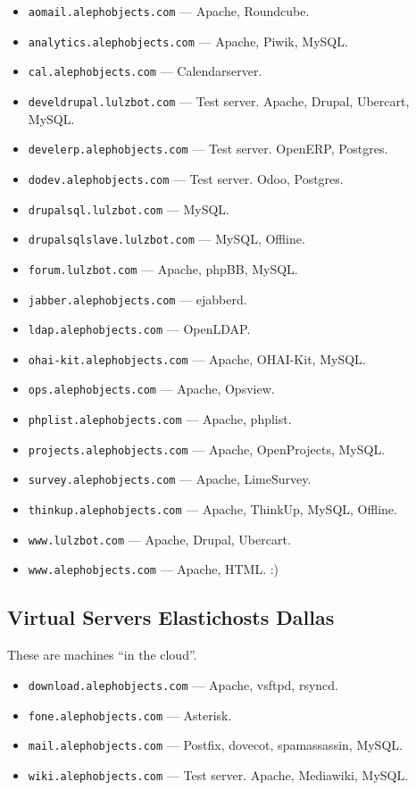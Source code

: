 \begin{itemize}
\item \texttt{aomail.alephobjects.com} --- Apache, Roundcube.
\item \texttt{analytics.alephobjects.com}  --- Apache, Piwik, MySQL.
\item \texttt{cal.alephobjects.com} --- Calendarserver.
\item \texttt{develdrupal.lulzbot.com} --- Test server. Apache, Drupal,
       Ubercart, MySQL.
\item \texttt{develerp.alephobjects.com} --- Test server. OpenERP, Postgres.
\item \texttt{dodev.alephobjects.com} --- Test server. Odoo, Postgres.
\item \texttt{drupalsql.lulzbot.com} --- MySQL.
\item \texttt{drupalsqlslave.lulzbot.com} --- MySQL, Offline.
\item \texttt{forum.lulzbot.com} --- Apache, phpBB, MySQL.
\item \texttt{jabber.alephobjects.com} --- ejabberd.
\item \texttt{ldap.alephobjects.com} --- OpenLDAP.
\item \texttt{ohai-kit.alephobjects.com} --- Apache, OHAI-Kit, MySQL.
\item \texttt{ops.alephobjects.com} --- Apache, Opsview.
\item \texttt{phplist.alephobjects.com} --- Apache, phplist.
\item \texttt{projects.alephobjects.com} --- Apache, OpenProjects, MySQL.
\item \texttt{survey.alephobjects.com} --- Apache, LimeSurvey.
\item \texttt{thinkup.alephobjects.com} --- Apache, ThinkUp, MySQL, Offline.
\item \texttt{www.lulzbot.com} --- Apache, Drupal, Ubercart.
\item \texttt{www.alephobjects.com} --- Apache, HTML.  :)
\end{itemize}

\subsection{Virtual Servers Elastichosts Dallas}
These are machines ``in the cloud''.

\begin{itemize}
\item \texttt{download.alephobjects.com} --- Apache, vsftpd, rsyncd.
\item \texttt{fone.alephobjects.com} --- Asterisk.
\item \texttt{mail.alephobjects.com} --- Postfix, dovecot, spamassassin, MySQL.
\item \texttt{wiki.alephobjects.com} --- Test server. Apache, Mediawiki, MySQL.
\end{itemize}

